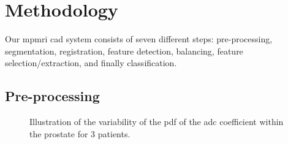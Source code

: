 \section{Methodology}\label{sec:chp6:method}

Our \ac{mpmri} \ac{cad} system consists of seven different steps: pre-processing, segmentation, registration, feature detection, balancing, feature selection/extraction, and finally classification.

\subsection{Pre-processing}\label{subsec:chp6:method:PP}

\begin{figure}
  \hspace*{\fill}
  \hfill
  \hfill
  \hspace*{\fill}
  \caption[Illustration of the \acs*{pdf} of the \acs*{adc} coefficient within the prostate.]{Illustration of the variability of the \acs*{pdf} of the \acs*{adc} coefficient within the prostate for 3 patients.}
  \label{fig:adcpdf}
\end{figure}


